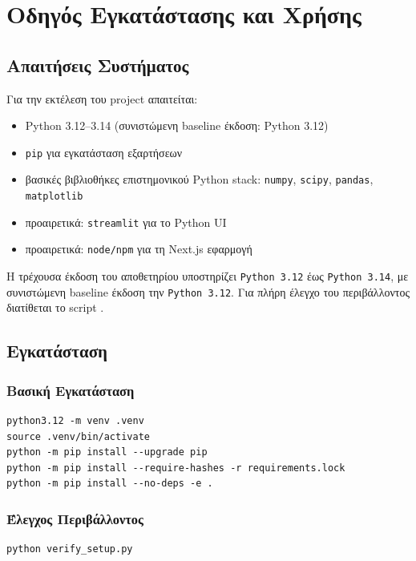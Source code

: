 \chapter{Οδηγός Εγκατάστασης και Χρήσης}
\label{app:usage}

\section{Απαιτήσεις Συστήματος}

Για την εκτέλεση του project απαιτείται:
\begin{itemize}
    \item Python 3.12--3.14 (συνιστώμενη baseline έκδοση: Python 3.12)
    \item \texttt{pip} για εγκατάσταση εξαρτήσεων
    \item βασικές βιβλιοθήκες επιστημονικού Python stack:
    \texttt{numpy}, \texttt{scipy}, \texttt{pandas}, \texttt{matplotlib}
    \item προαιρετικά: \texttt{streamlit} για το Python UI
    \item προαιρετικά: \texttt{node/npm} για τη Next.js εφαρμογή
\end{itemize}

Η τρέχουσα έκδοση του αποθετηρίου υποστηρίζει \texttt{Python 3.12} έως \texttt{Python 3.14}, με συνιστώμενη baseline έκδοση την \texttt{Python 3.12}. Για πλήρη έλεγχο του περιβάλλοντος διατίθεται το script .

\section{Εγκατάσταση}

\subsection{Βασική Εγκατάσταση}

\begin{lstlisting}
python3.12 -m venv .venv
source .venv/bin/activate
python -m pip install --upgrade pip
python -m pip install --require-hashes -r requirements.lock
python -m pip install --no-deps -e .
\end{lstlisting}

\subsection{Έλεγχος Περιβάλλοντος}

\begin{lstlisting}
python verify_setup.py
\end{lstlisting}

